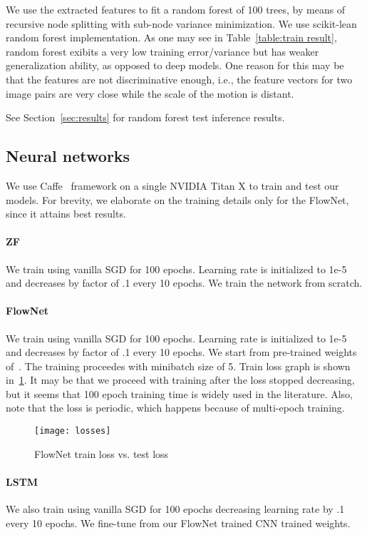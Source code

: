 We use the extracted features to fit a random forest of 100 trees, by
means of recursive node splitting with sub-node variance minimization.
We use scikit-lean~\cite{scikit-learn} random forest implementation.
As one may see in Table~\ref{table:train result}, random forest
exibits a very low training error/variance but has weaker
generalization ability, as opposed to deep models.  One reason for
this may be that the features are not discriminative enough, i.e., the
feature vectors for two image pairs are very close while the scale of
the motion is distant.

See Section~\ref{sec:results} for random forest test inference
results.

\subsection{Neural networks}

We use Caffe~\cite{jia2014caffe} framework on a single NVIDIA Titan X
to train and test our models. For brevity, we elaborate on the
training details only for the FlowNet, since it attains best results.

\paragraph{ZF} We train using vanilla SGD for 100 epochs. Learning
rate is initialized to 1e-5 and decreases by factor of .1 every 10
epochs. We train the network from scratch.


\paragraph{FlowNet} We train using vanilla SGD for 100
epochs. Learning rate is initialized to 1e-5 and decreases by factor
of .1 every 10 epochs. We start from pre-trained weights
of~\cite{fischer2015flownet}. The training proceedes with minibatch
size of 5. Train loss graph is shown in~\ref{fig:flownet_train_loss}.
It may be that we proceed with training after the loss stopped
decreasing, but it seems that 100 epoch training time is widely used
in the literature.  Also, note that the loss is periodic, which
happens because of multi-epoch training.  
\begin{figure}[!ht]
  \centering
  \texttt{[image: losses]}
  \caption{FlowNet train loss vs. test loss}
  \label{fig:flownet_train_loss}
\end{figure}

\paragraph{LSTM} We also train using vanilla SGD for 100 epochs
decreasing learning rate by .1 every 10 epochs.  We fine-tune from our
FlowNet trained CNN trained weights.

